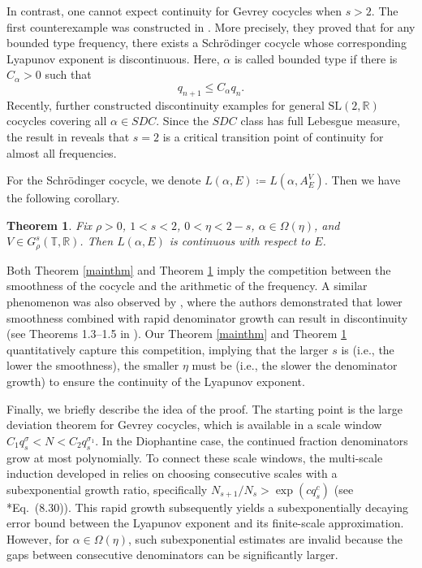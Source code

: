 \documentclass[reqno,12pt]{amsart}
\theoremstyle{plain}
\newtheorem{theorem}{Theorem}[section]
\theoremstyle{definition}
\numberwithin{equation}{section}
\begin{document}
In contrast, one cannot expect continuity for Gevrey cocycles when $s>2$. The first counterexample was constructed in \cite{ge2021transition}. More precisely, they proved that for any bounded type frequency, there exists a Schr\"odinger cocycle whose corresponding Lyapunov exponent is discontinuous. Here, $\alpha$ is called bounded type if there is $C_{\alpha}>0$ such that
\begin{equation*}
    q_{n+1}\leqslant C_{\alpha}q_{n}.
\end{equation*}
Recently, \cite{liang2025discontinuity} further constructed discontinuity examples for general $\mathrm{SL}(2,\mathbb{R})$ cocycles covering all $\alpha\in SDC$. Since the $SDC$ class has full Lebesgue measure, the result in \cite{liang2025discontinuity} reveals that $s=2$ is a critical transition point of continuity for almost all frequencies.

For the Schr\"odinger cocycle, we denote $L(\alpha,E)\coloneq L(\alpha,A_{E}^{V})$. Then we have the following corollary.
\begin{theorem}\label{corosc}
    Fix $\rho>0$, $1<s<2$, $0<\eta<2-s$, $\alpha\in \Omega(\eta)$, and $V\in G^{s}_{\rho}(\mathbb{T},\mathbb{R})$. Then $L(\alpha,E)$ is continuous with respect to $E$.
\end{theorem}

Both Theorem \ref{mainthm} and Theorem \ref{corosc} imply the competition between the smoothness of the cocycle and the arithmetic of the frequency. A similar phenomenon was also observed by \cite{liang2025discontinuity}, where the authors demonstrated that lower smoothness combined with rapid denominator growth can result in discontinuity (see Theorems 1.3--1.5 in \cite{liang2025discontinuity}).
Our Theorem \ref{mainthm} and Theorem \ref{corosc} quantitatively capture this competition, implying that the larger $s$ is (i.e., the lower the smoothness), the smaller $\eta$ must be (i.e., the slower the denominator growth) to ensure the continuity of the Lyapunov exponent.


Finally, we briefly describe the idea of the proof. The starting point is the large deviation theorem for Gevrey cocycles, which is available in a scale window $C_1q_{s}^\sigma<N<C_2q_{s}^{\sigma_1}$. In the Diophantine case, the continued fraction denominators grow at most polynomially. To connect these scale windows, the multi-scale induction developed in \cite{MR4477429} relies on choosing consecutive scales with a subexponential growth ratio, specifically $N_{s+1}/N_{s} > \exp(cq_{s}^{c})$ (see \cite{MR4477429}*{Eq.~(8.30)}). This rapid growth subsequently yields a subexponentially decaying error bound between the Lyapunov exponent and its finite-scale approximation. However, for $\alpha\in\Omega(\eta)$, such subexponential estimates are invalid because the gaps between consecutive denominators can be significantly larger.
\end{document}
